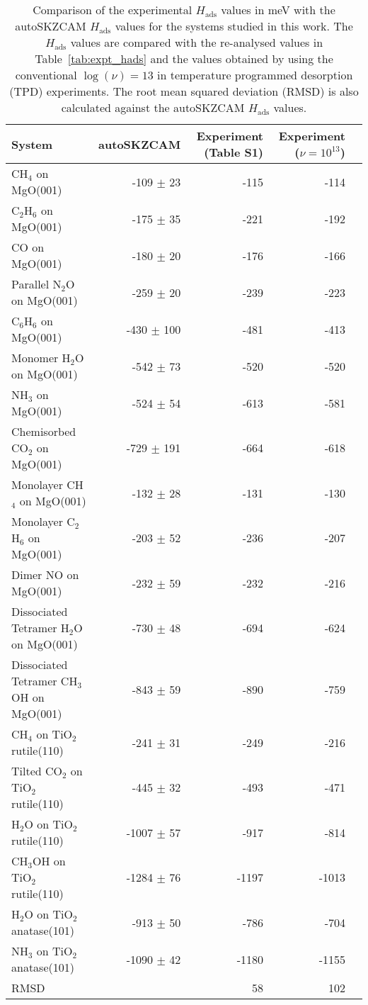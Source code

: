 \begin{table}
\caption{\label{tab:hads_nu13_comparison}Comparison of the experimental $H_\text{ads}$ values in meV with the autoSKZCAM $H_\text{ads}$ values for the systems studied in this work. The $H_\text{ads}$ values are compared with the re-analysed values in Table~\ref{tab:expt_hads} and the values obtained by using the conventional $\log(\nu)=13$ in temperature programmed desorption (TPD) experiments. The root mean squared deviation (RMSD) is also calculated against the autoSKZCAM $H_\text{ads}$ values.}
\begin{adjustbox}{center,max width=1\textwidth}
\begin{tabular}{lrrrr}
\toprule
System & autoSKZCAM & Experiment (Table S1) & Experiment ($\nu{=}10^{13}$) \\ 
\midrule
CH$_4$ on MgO(001) & -109 $\pm$ 23 & -115 & -114 \\
C$_2$H$_6$ on MgO(001) & -175 $\pm$ 35 & -221 & -192 \\
CO on MgO(001) & -180 $\pm$ 20 & -176 & -166 \\
Parallel N$_2$O on MgO(001) & -259 $\pm$ 20 & -239 & -223 \\
C$_6$H$_6$ on MgO(001) & -430 $\pm$ 100 & -481 & -413 \\
Monomer H$_2$O on MgO(001) & -542 $\pm$ 73 & -520 & -520 \\
NH$_3$ on MgO(001) & -524 $\pm$ 54 & -613 & -581 \\
Chemisorbed CO$_2$ on MgO(001) & -729 $\pm$ 191 & -664 & -618 \\
Monolayer CH$_4$ on MgO(001) & -132 $\pm$ 28 & -131 & -130 \\
Monolayer C$_2$H$_6$ on MgO(001) & -203 $\pm$ 52 & -236 & -207 \\
Dimer NO on MgO(001) & -232 $\pm$ 59 & -232 & -216 \\
Dissociated Tetramer H$_2$O on MgO(001) & -730 $\pm$ 48 & -694 & -624 \\
Dissociated Tetramer CH$_3$OH on MgO(001) & -843 $\pm$ 59 & -890 & -759 \\
CH$_4$ on TiO$_2$ rutile(110) & -241 $\pm$ 31 & -249 & -216 \\
Tilted CO$_2$ on TiO$_2$ rutile(110) & -445 $\pm$ 32 & -493 & -471 \\
H$_2$O on TiO$_2$ rutile(110) & -1007 $\pm$ 57 & -917 & -814 \\
CH$_3$OH on TiO$_2$ rutile(110) & -1284 $\pm$ 76 & -1197 & -1013 \\
H$_2$O on TiO$_2$ anatase(101) & -913 $\pm$ 50 & -786 & -704 \\
NH$_3$ on TiO$_2$ anatase(101) & -1090 $\pm$ 42 & -1180 & -1155 \\
RMSD &  & 58 & 102 \\
\bottomrule
\end{tabular}
\end{adjustbox}
\end{table}